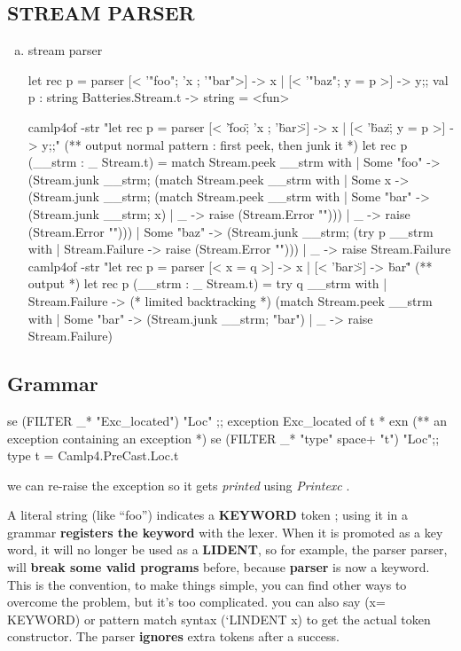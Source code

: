 \subsection{STREAM PARSER}
  \begin{enumerate}[(a)]
  \item stream parser

\begin{alternate}
let rec p = parser [< '"foo"; 'x ; '"bar">] -> x | [< '"baz"; y = p >] -> y;;
val p : string Batteries.Stream.t -> string = <fun>
\end{alternate}

\begin{ocamlcode}
camlp4of  -str "let rec p = parser [< '\"foo\"; 'x ; '\"bar\">] -> x | [< '\"baz\"; y = p >] -> y;;"
(** output 
   normal pattern : first peek, then junk it 
*)
let rec p (__strm : _ Stream.t) =
  match Stream.peek __strm with
  | Some "foo" ->
      (Stream.junk __strm;
       (match Stream.peek __strm with
        | Some x ->
            (Stream.junk __strm;
             (match Stream.peek __strm with
              | Some "bar" -> (Stream.junk __strm; x)
              | _ -> raise (Stream.Error "")))
        | _ -> raise (Stream.Error "")))
  | Some "baz" ->
      (Stream.junk __strm;
       (try p __strm with | Stream.Failure -> raise (Stream.Error "")))
  | _ -> raise Stream.Failure
camlp4of -str "let rec p = parser [< x = q >] -> x | [< '\"bar\">] -> \"bar\""
(** output  *)
let rec p (__strm : _ Stream.t) =
  try q __strm
  with
  | Stream.Failure -> (* limited backtracking *)
      (match Stream.peek __strm with
       | Some "bar" -> (Stream.junk __strm; "bar")
       | _ -> raise Stream.Failure)
\end{ocamlcode}
  \end{enumerate}

\subsection{Grammar}


\begin{ocamlcode}
se (FILTER _* "Exc_located") "Loc" ;;
exception Exc_located of t * exn 
(** an exception containing an exception *)
se (FILTER _* "type" space+ "t") "Loc";; 
type t = Camlp4.PreCast.Loc.t
\end{ocamlcode}

we can re-raise the exception so it gets \textit{printed} using
\textit{Printexc} .

A literal string (like ``foo'') indicates a \textbf{KEYWORD} token ;
using it in a grammar \textbf{registers the keyword} with the lexer. When
it is promoted as a key word, it will no longer be used as a \textbf{
  LIDENT}, so for example, the parser parser, will \textbf{break some valid
programs} before, because \textbf{parser} is now a keyword. This is the
convention, to make things simple, you can find other ways to overcome
the problem, but it's too complicated. you can also say (x= KEYWORD)
or pattern match syntax (`LINDENT x) to get the actual token
constructor. The parser \textbf{ignores} extra tokens after a success.


